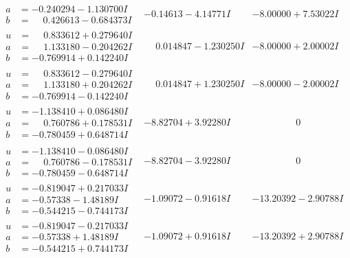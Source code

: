 \documentclass[1p]{elsarticle_modified}
\theoremstyle{definition}
\begin{document}
$$\begin{array}{c|c|c}
\begin{aligned}
a &= -0.240294 - 1.130700 I \\
b &= \phantom{-}0.426613 - 0.684373 I\end{aligned}
 & -0.14613 - 4.14771 I & -8.00000 + 7.53022 I \\ \hline\begin{aligned}
u &= \phantom{-}0.833612 + 0.279640 I \\
a &= \phantom{-}1.133180 - 0.204262 I \\
b &= -0.769914 + 0.142240 I\end{aligned}
 & \phantom{-}0.014847 - 1.230250 I & -8.00000 + 2.00002 I \\ \hline\begin{aligned}
u &= \phantom{-}0.833612 - 0.279640 I \\
a &= \phantom{-}1.133180 + 0.204262 I \\
b &= -0.769914 - 0.142240 I\end{aligned}
 & \phantom{-}0.014847 + 1.230250 I & -8.00000 - 2.00002 I \\ \hline\begin{aligned}
u &= -1.138410 + 0.086480 I \\
a &= \phantom{-}0.760786 + 0.178531 I \\
b &= -0.780459 + 0.648714 I\end{aligned}
 & -8.82704 + 3.92280 I & \phantom{-0.000000 } 0 \\ \hline\begin{aligned}
u &= -1.138410 - 0.086480 I \\
a &= \phantom{-}0.760786 - 0.178531 I \\
b &= -0.780459 - 0.648714 I\end{aligned}
 & -8.82704 - 3.92280 I & \phantom{-0.000000 } 0 \\ \hline\begin{aligned}
u &= -0.819047 + 0.217033 I \\
a &= -0.57338 - 1.48189 I \\
b &= -0.544215 - 0.744173 I\end{aligned}
 & -1.09072 - 0.91618 I & -13.20392 - 2.90788 I \\ \hline\begin{aligned}
u &= -0.819047 - 0.217033 I \\
a &= -0.57338 + 1.48189 I \\
b &= -0.544215 + 0.744173 I\end{aligned}
 & -1.09072 + 0.91618 I & -13.20392 + 2.90788 I \\ \hline\begin{aligned}

\end{aligned}
\end{array}$$
\end{document}
